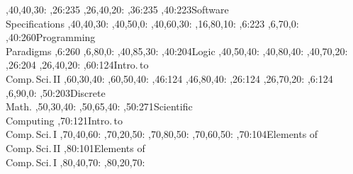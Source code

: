 \begin{center}
{,40,40,30:
,26:{235}
,26,40,20:
,36:{235}
,40:{223}{Software\\ Specifications}
,40,40,30:
,40,50,0:
,40,60,30:
,16,80,10:
,6:{223}
,6,70,0:
,40:{260}{Programming\\ Paradigms}
,6:{260}
,6,80,0:
,40,85,30:
,40:{204}{Logic}
\ctdot
{},40,50,40:
,40,80,40:
\ctsolid
{},40,70,20:
,26:{204}
,26,40,20:
,60:{124}{Intro.\,to\\ Comp.\,Sci.\,II}
,60,30,40:
,60,50,40:
,46:{124}
,46,80,40:
,26:{124}
,26,70,20:
,6:{124}
,6,90,0:
,50:{203}{Discrete\\ Math.}
,50,30,40:
,50,65,40:
,50:{271}{Scientific\\ Computing}
,70:{121}{Intro.\,to\\ Comp.\,Sci.\,I}
,70,40,60:
,70,20,50:
,70,80,50:
\ctdot
{},70,60,50:
\ctsolid
{},70:{104}{Elements of\\ Comp.\,Sci.\,II} 
,80:{101}{Elements of\\ Comp.\,Sci.\,I}
,80,40,70:
,80,20,70:
}
\end{center}


